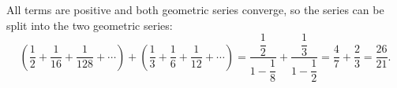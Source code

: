 All terms are positive and both geometric series converge, so the series can be split into the two geometric series:
\[\left(\dfrac12+\dfrac{1}{16}+\dfrac{1}{128}+\cdots\right)+\left(\dfrac13+\dfrac16+\dfrac{1}{12}+\cdots\right)=\dfrac{\dfrac12}{1-\dfrac18}+\dfrac{\dfrac13}{1-\dfrac12}=\dfrac47+\dfrac23=\boxed{\dfrac{26}{21}}.\]
